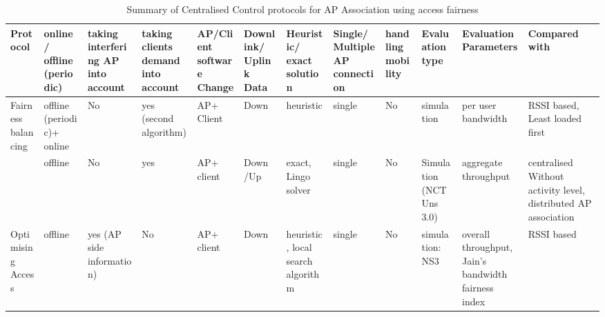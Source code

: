 \documentclass[journal,transmag]{IEEEtran}
\begin{document}
\begin{table}
\centering\caption{Summary of Centralised Control protocols for AP Association using access fairness \label{Tab:centralised_access_fairness}}
\begin{tabular} {|p{1.05cm}|p{.7cm}|p{1.1cm}|p{.6cm}|p{.8cm}|p{1.1cm}|p{1.2cm}|p{1.1cm}|p{}|p{} |p{}|p{}|}
\hline
\cellcolor{xy}\scriptsize{Protocol} & \cellcolor{xy}\scriptsize{online/ offline (periodic)} & \cellcolor{xy}\scriptsize{taking interfering AP into account} & \cellcolor{xy}\scriptsize{taking clients demand into account} & \cellcolor{xy}\scriptsize{AP/Client software Change} & \cellcolor{xy} \scriptsize{Downlink/ Uplink Data} & \cellcolor{xy} \scriptsize{Heuristic/ exact solution} & \cellcolor{xy} \scriptsize{Single/Multiple AP connection} & \cellcolor{xy} \scriptsize{handling mobility} & \cellcolor{xy}\scriptsize{Evaluation type} & \cellcolor{xy}\scriptsize{Evaluation Parameters} & \cellcolor{xy}\scriptsize{Compared with} \\\hline\hline

\scriptsize{Fairness balancing \cite{04Fairness_load_balancing_WLAN,07fairness_load_balancing_LAN}}  &\scriptsize{offline (periodic)+ online} &\scriptsize{No} &\scriptsize{yes (second algorithm)} &\scriptsize{AP+ Client}  &\scriptsize{Down} &\scriptsize{heuristic} &\scriptsize{single} &\scriptsize{No} &\scriptsize{simulation} &\scriptsize{per user bandwidth} &\scriptsize{RSSI based, Least loaded first} \\\hline 

\scriptsize{\cite{07optimal_association_MSWIM}} &\scriptsize{offline} &\scriptsize{No}  &\scriptsize{yes} &\scriptsize{AP+ client} &\scriptsize{Down /Up} &\scriptsize{exact, Lingo solver} &\scriptsize{single} &\scriptsize{No} &\scriptsize{Simulation (NCTUns 3.0)} &\scriptsize{aggregate throughput} &\scriptsize{centralised Without activity level, distributed AP association} \\\hline

\scriptsize{Optimising Access \cite{16AP_association_optimisation_fairness}} &\scriptsize{offline} &\scriptsize{yes (AP side information)} &\scriptsize{No} &\scriptsize{AP+ client} &\scriptsize{Down} &\scriptsize{heuristic, local search algorithm} &\scriptsize{single} &\scriptsize{No} &\scriptsize{simulation: NS3} &\scriptsize{overall throughput, Jain's bandwidth fairness index} &\scriptsize{RSSI based} \\\hline 

\end{tabular}

\end{table} 
\end{document}
